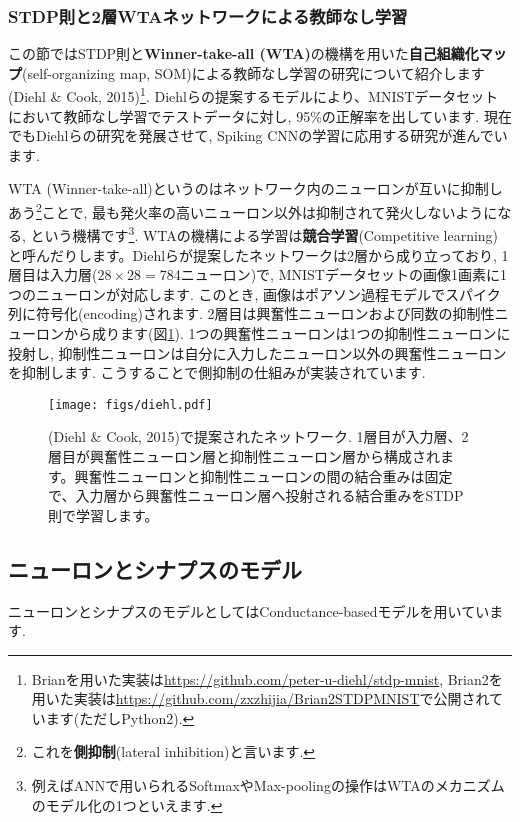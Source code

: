 \subsubsection{STDP則と2層WTAネットワークによる教師なし学習}
この節ではSTDP則と\textbf{Winner-take-all (WTA)}の機構を用いた\textbf{自己組織化マップ}(self-organizing map, SOM)による教師なし学習の研究について紹介します(Diehl \& Cook, 2015)\footnote{Brianを用いた実装は\url{https://github.com/peter-u-diehl/stdp-mnist}, Brian2を用いた実装は\url{https://github.com/zxzhijia/Brian2STDPMNIST}で公開されています(ただしPython2). }. Diehlらの提案するモデルにより、MNISTデータセットにおいて教師なし学習でテストデータに対し, 95\%の正解率を出しています. 現在でもDiehlらの研究を発展させて, Spiking CNNの学習に応用する研究が進んでいます. \par
WTA (Winner-take-all)というのはネットワーク内のニューロンが互いに抑制しあう\footnote{これを\textbf{側抑制}(lateral inhibition)と言います. }ことで, 最も発火率の高いニューロン以外は抑制されて発火しないようになる, という機構です\footnote{例えばANNで用いられるSoftmaxやMax-poolingの操作はWTAのメカニズムのモデル化の1つといえます. }. WTAの機構による学習は\textbf{競合学習}(Competitive learning)と呼んだりします。Diehlらが提案したネットワークは2層から成り立っており, 1層目は入力層($28\times 28=$784ニューロン)で, MNISTデータセットの画像1画素に1つのニューロンが対応します. このとき, 画像はポアソン過程モデルでスパイク列に符号化(encoding)されます. 2層目は興奮性ニューロンおよび同数の抑制性ニューロンから成ります(図\ref{fig:diehl}). 1つの興奮性ニューロンは1つの抑制性ニューロンに投射し, 抑制性ニューロンは自分に入力したニューロン以外の興奮性ニューロンを抑制します. こうすることで側抑制の仕組みが実装されています. 
\begin{figure}[htbp]
    \centering
    \texttt{[image: figs/diehl.pdf]}
    \caption{(Diehl \& Cook, 2015)で提案されたネットワーク.  1層目が入力層、2層目が興奮性ニューロン層と抑制性ニューロン層から構成されます。興奮性ニューロンと抑制性ニューロンの間の結合重みは固定で、入力層から興奮性ニューロン層へ投射される結合重みをSTDP則で学習します。}
    \label{fig:diehl}
\end{figure}

\subsection{ニューロンとシナプスのモデル}
ニューロンとシナプスのモデルとしてはConductance-basedモデルを用いています. 
